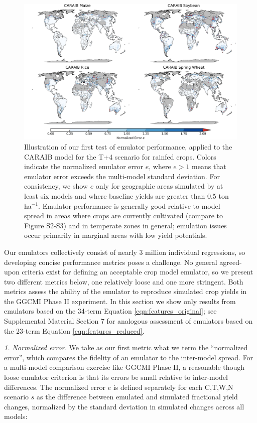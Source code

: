 \documentclass[gmdd]{copernicus} %
\begin{document}
\begin{figure}[ht]
\centering
    \includegraphics[width=16.3cm]{figures/CARAIB_spatial_error.png}
    \caption{
    Illustration of our first test of emulator performance, applied to the CARAIB model for the T+4 scenario for rainfed crops. 
    Colors indicate the normalized emulator error $e$, where $e > 1$ means that emulator error exceeds the multi-model standard deviation. 
    For consistency, we show $e$ only for geographic areas simulated by at least six models and where baseline yields are greater than 0.5 ton ha$^{-1}$.
    Emulator performance is generally good relative to model spread in areas where crops are currently cultivated (compare to Figure S2-S3) and in temperate zones in general; emulation issues occur primarily in marginal areas with low yield potentials. 
    }
   \label{fig:error}
\end{figure}

Our emulators collectively consist of nearly 3 million individual regressions, so developing concise performance metrics poses a challenge.
No general agreed-upon criteria exist for defining an acceptable crop model emulator, so we present two different metrics below, one relatively loose and one more stringent.  
Both metrics assess the ability of the emulator to reproduce simulated crop yields in the GGCMI Phase II experiment. 
In this section we show only results from emulators based on the 34-term Equation \ref{eqn:features_original};
see Supplemental Material Section 7 for analogous assessment of emulators based on the 23-term Equation \ref{eqn:features_reduced}.

\smallskip
\textit{1. Normalized error.} 
We take as our first metric what we term the ``normalized error'', which compares the fidelity of an emulator to the inter-model spread. 
For a multi-model comparison exercise like GGCMI Phase II, a reasonable though loose emulator criterion is that its errors be small relative to inter-model differences. The normalized error $e$ is defined separately for each C,T,W,N scenario $s$ as the difference between emulated and simulated fractional yield changes, normalized by the standard deviation in simulated changes across all models: 
\end{document}
